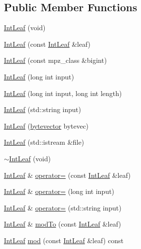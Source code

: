 \subsection*{Public Member Functions}
\begin{DoxyCompactItemize}
\item 
\hyperlink{class_int_leaf_a1edff3e6ab3ccf64907420ac84d71b70}{Int\-Leaf} (void)
\item 
\hyperlink{class_int_leaf_a06aaabf11bc0d0851e3df7b705ca1ccb}{Int\-Leaf} (const \hyperlink{class_int_leaf}{Int\-Leaf} \&leaf)
\item 
\hyperlink{class_int_leaf_affd60a076c8a9f1be25644a8d17a939b}{Int\-Leaf} (const mpz\-\_\-class \&bigint)
\item 
\hyperlink{class_int_leaf_a65e0a79456dc0b8fd1d33c03991b3848}{Int\-Leaf} (long int input)
\item 
\hyperlink{class_int_leaf_adfcd1af6b8cd149609c00170cb3380e6}{Int\-Leaf} (long int input, long int length)
\item 
\hyperlink{class_int_leaf_a7fae91565854dcf68de2a6730f56cce3}{Int\-Leaf} (std\-::string input)
\item 
\hyperlink{class_int_leaf_ad115e1df24da76baedaacc1543ae33cd}{Int\-Leaf} (\hyperlink{types_8h_a64b5be62be31dcda165d2c6c3c262fb5}{bytevector} bytevec)
\item 
\hyperlink{class_int_leaf_a59d3493348dc590c5b2021d63049ec1e}{Int\-Leaf} (std\-::istream \&file)
\item 
\hyperlink{class_int_leaf_a098a7534215db34214dd1302cc963758}{$\sim$\-Int\-Leaf} (void)
\item 
\hyperlink{class_int_leaf}{Int\-Leaf} \& \hyperlink{class_int_leaf_a9bbc6aea2aecae8c20288c6917b3523e}{operator=} (const \hyperlink{class_int_leaf}{Int\-Leaf} \&leaf)
\item 
\hyperlink{class_int_leaf}{Int\-Leaf} \& \hyperlink{class_int_leaf_a80707cbdf1e4fdfd705acb6b1e0b445c}{operator=} (long int input)
\item 
\hyperlink{class_int_leaf}{Int\-Leaf} \& \hyperlink{class_int_leaf_a4447ab3008de3bb7cda20715e72b11a0}{operator=} (std\-::string input)
\item 
\hyperlink{class_int_leaf}{Int\-Leaf} \& \hyperlink{class_int_leaf_a691407858bdc596bc1be48f8d3ae9c62}{mod\-To} (const \hyperlink{class_int_leaf}{Int\-Leaf} \&leaf)
\item 
\hyperlink{class_int_leaf}{Int\-Leaf} \hyperlink{class_int_leaf_a4e645145141d0f8ded8afdd2c6aa7228}{mod} (const \hyperlink{class_int_leaf}{Int\-Leaf} \&leaf) const 

\end{DoxyCompactItemize}
